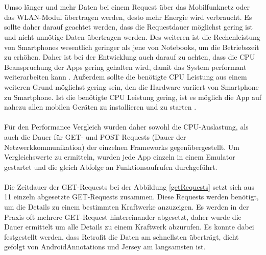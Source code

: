 \\\\
Umso länger und mehr Daten bei einem Request über das Mobilfunknetz oder das WLAN-Modul übertragen werden, desto mehr Energie wird verbraucht. Es sollte daher darauf geachtet werden, dass die Requestdauer möglichst gering ist und nicht unnötige Daten übertragen werden. Des weiteren ist die Rechenleistung von Smartphones  wesentlich geringer als jene von Notebooks, um die Betriebszeit zu erhöhen. Daher ist bei der Entwicklung auch darauf zu achten, dass die CPU Beanspruchung der Apps gering gehalten wird, damit das System performant weiterarbeiten kann \cite{mittal:energy}. Außerdem sollte die benötigte CPU Leistung aus einem weiteren Grund möglichst gering sein, den die Hardware variiert von Smartphone zu Smartphone. Ist die benötigte CPU Leistung gering, ist es möglich die App auf nahezu allen mobilen Geräten zu installieren und zu starten \cite{joorabchi:challenges}. 
\\\\
Für den Performance Vergleich wurden daher sowohl die CPU-Auslastung, als auch die Dauer für GET- und POST Requests (Dauer der Netzwerkkommunikation) der einzelnen Frameworks gegenübergestellt. Um Vergleichswerte zu ermitteln, wurden jede App einzeln in einem Emulator gestartet und die gleich Abfolge an Funktionsaufrufen durchgeführt. 
\\\\
Die Zeitdauer der GET-Requests bei der Abbildung \ref{getRequests} setzt sich aus 11 einzeln abgesetzte GET-Requests zusammen. Diese Requests werden benötigt, um die Details zu einem bestimmten Kraftwerke anzuzeigen. Es werden in der Praxis oft mehrere GET-Request hintereinander abgesetzt, daher wurde die Dauer ermittelt um alle Details zu einem Kraftwerk abzurufen. Es konnte dabei festgestellt werden, dass Retrofit die Daten am schnellsten überträgt, dicht gefolgt von AndroidAnnotations und Jersey am langsamsten ist.

